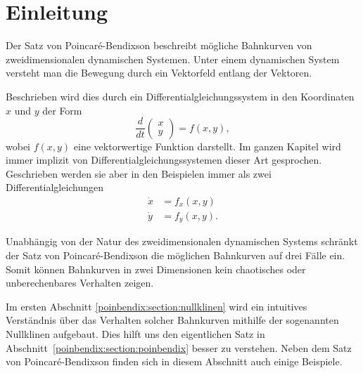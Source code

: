 \section{Einleitung} \label{poinbendix:section:einleitung}

Der Satz von Poincaré-Bendixson beschreibt mögliche Bahnkurven von zweidimensionalen dynamischen Systemen.
%
%
Unter einem dynamischen System versteht man die Bewegung durch ein Vektorfeld entlang der Vektoren.

Beschrieben wird dies durch ein Differentialgleichungssystem in den Koordinaten $x$ und $y$ der Form
\begin{equation*}
\frac{d}{dt}
\begin{pmatrix}x\\y\end{pmatrix}
=
f(x,y),
\end{equation*}
wobei $f(x,y)$ eine vektorwertige Funktion darstellt.
Im ganzen Kapitel wird immer implizit von Differentialgleichungssystemen dieser Art gesprochen.
Geschrieben werden sie aber in den Beispielen immer als zwei Differentialgleichungen
\begin{align*}
    \dot{x} &= f_x(x, y) \\
    \dot{y} &= f_y(x, y).
\end{align*}

Unabhängig von der Natur des zweidimensionalen dynamischen Systems schränkt der Satz von Poincaré-Bendixson die möglichen Bahnkurven auf drei Fälle ein.
Somit können Bahnkurven in zwei Dimensionen kein chaotisches oder unberechenbares Verhalten zeigen.
%

Im ersten Abschnitt \ref{poinbendix:section:nullklinen} wird ein intuitives Verständnis über das Verhalten solcher Bahnkurven mithilfe der sogenannten Nullklinen aufgebaut.
Dies hilft uns den eigentlichen Satz in Abschnitt~\ref{poinbendix:section:poinbendix} besser zu verstehen.
Neben dem Satz von Poincaré-Bendixson finden sich in diesem Abschnitt auch einige Beispiele.
